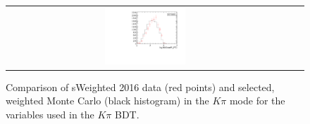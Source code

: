\begin{figure}
\begin{tabular}{ccc}
\includegraphics[width=0.3\textwidth]{ANA_resources/Plots/Monte_carlo/data_vs_MC/weight/Kpi/log10(KstarPi_PT)_2016.pdf} & & \\
\end{tabular}
\caption{Comparison of sWeighted 2016 data (red points) and selected, weighted Monte Carlo (black histogram) in the $K\pi$ mode for the variables used in the $K\pi$ BDT.}
\label{fig:data_vs_MC_Kpi_2016}
\end{figure}
